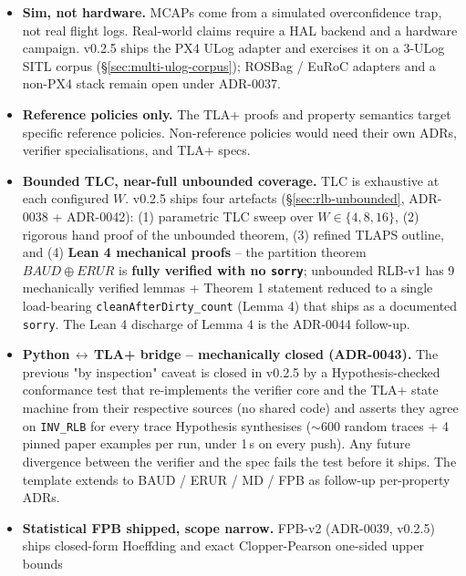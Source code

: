 \documentclass[11pt,a4paper]{article}
\begin{document}
\begin{itemize}
  \item \textbf{Sim, not hardware.} MCAPs come from a simulated
        overconfidence trap, not real flight logs. Real-world
        claims require a HAL backend and a hardware campaign.
        v0.2.5 ships the PX4 ULog adapter and exercises it on a
        3-ULog SITL corpus (\S\ref{sec:multi-ulog-corpus});
        ROSBag / EuRoC adapters and a non-PX4 stack remain open
        under ADR-0037.
  \item \textbf{Reference policies only.} The TLA+ proofs and
        property semantics target specific reference policies.
        Non-reference policies would need their own ADRs, verifier
        specialisations, and TLA+ specs.
  \item \textbf{Bounded TLC, near-full unbounded coverage.}
        TLC is exhaustive at each configured $W$. v0.2.5 ships
        four artefacts (\S\ref{sec:rlb-unbounded}, ADR-0038 +
        ADR-0042): (1) parametric TLC sweep over
        $W \in \{4, 8, 16\}$, (2) rigorous hand proof of the
        unbounded theorem, (3) refined TLAPS outline, and (4)
        \textbf{Lean 4 mechanical proofs} -- the partition theorem
        $\mathit{BAUD} \oplus \mathit{ERUR}$ is \textbf{fully
        verified with no \texttt{sorry}}; unbounded RLB-v1 has 9
        mechanically verified lemmas + Theorem 1 statement
        reduced to a single load-bearing
        \texttt{cleanAfterDirty\_count} (Lemma 4) that ships as a
        documented \texttt{sorry}. The Lean 4 discharge of Lemma
        4 is the ADR-0044 follow-up.
  \item \textbf{Python\,$\leftrightarrow$\,TLA+ bridge --
        mechanically closed (ADR-0043).} The previous "by
        inspection" caveat is closed in v0.2.5 by a
        Hypothesis-checked conformance test that re-implements
        the verifier core and the TLA+ state machine from their
        respective sources (no shared code) and asserts they
        agree on \texttt{INV\_RLB} for every trace Hypothesis
        synthesises ($\sim$600 random traces + 4 pinned paper
        examples per run, under 1\,s on every push). Any future
        divergence between the verifier and the spec fails the
        test before it ships. The template extends to BAUD /
        ERUR / MD / FPB as follow-up per-property ADRs.
  \item \textbf{Statistical FPB shipped, scope narrow.}
        FPB-v2 (ADR-0039, v0.2.5) ships closed-form Hoeffding
        and exact Clopper-Pearson one-sided upper bounds

\end{itemize}
\end{document}
